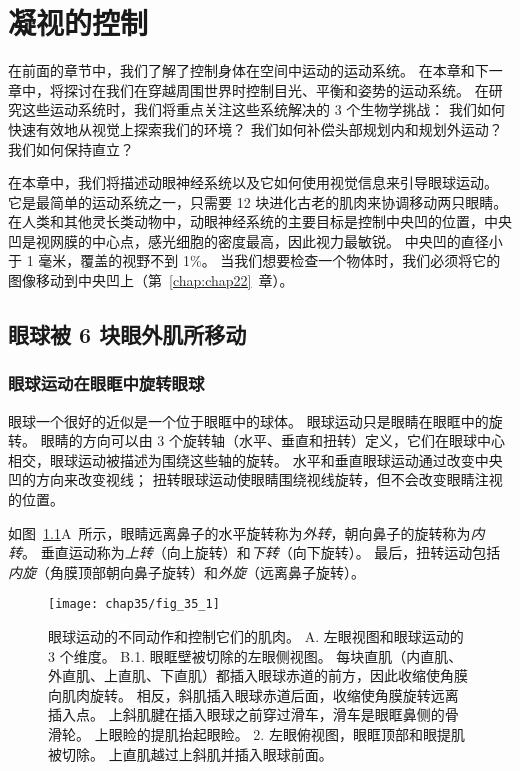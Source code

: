 \chapter{凝视的控制} \label{chap:chap35}

在前面的章节中，我们了解了控制身体在空间中运动的运动系统。
在本章和下一章中，将探讨在我们在穿越周围世界时控制目光、平衡和姿势的运动系统。
在研究这些运动系统时，我们将重点关注这些系统解决的 3 个生物学挑战：
我们如何快速有效地从视觉上探索我们的环境？
我们如何补偿头部规划内和规划外运动？
我们如何保持直立？


在本章中，我们将描述动眼神经系统以及它如何使用视觉信息来引导眼球运动。
它是最简单的运动系统之一，只需要 12 块进化古老的肌肉来协调移动两只眼睛。
在人类和其他灵长类动物中，动眼神经系统的主要目标是控制中央凹的位置，中央凹是视网膜的中心点，感光细胞的密度最高，因此视力最敏锐。
中央凹的直径小于 1 毫米，覆盖的视野不到 1\%。
当我们想要检查一个物体时，我们必须将它的图像移动到中央凹上（第~\ref{chap:chap22}~章）。



\section{眼球被 6 块眼外肌所移动}

\subsection{眼球运动在眼眶中旋转眼球}

眼球一个很好的近似是一个位于眼眶中的球体。
眼球运动只是眼睛在眼眶中的旋转。
眼睛的方向可以由 3 个旋转轴（水平、垂直和扭转）定义，它们在眼球中心相交，眼球运动被描述为围绕这些轴的旋转。
水平和垂直眼球运动通过改变中央凹的方向来改变视线；
扭转眼球运动使眼睛围绕视线旋转，但不会改变眼睛注视的位置。


如图~\ref{fig:35_1}A~所示，眼睛远离鼻子的水平旋转称为\textit{外转}，朝向鼻子的旋转称为\textit{内转}。 
垂直运动称为\textit{上转}（向上旋转）和\textit{下转}（向下旋转）。
最后，扭转运动包括\textit{内旋}（角膜顶部朝向鼻子旋转）和\textit{外旋}（远离鼻子旋转）。


\begin{figure}[htbp]
	\centering
	\texttt{[image: chap35/fig\_35\_1]}
	\caption{眼球运动的不同动作和控制它们的肌肉。
		A. 左眼视图和眼球运动的 3 个维度。
		B.1. 眼眶壁被切除的左眼侧视图。
		每块直肌（内直肌、外直肌、上直肌、下直肌）都插入眼球赤道的前方，因此收缩使角膜向肌肉旋转。
		相反，斜肌插入眼球赤道后面，收缩使角膜旋转远离插入点。
		上斜肌腱在插入眼球之前穿过滑车，滑车是眼眶鼻侧的骨滑轮。
		上眼睑的提肌抬起眼睑。
		2. 左眼俯视图，眼眶顶部和眼提肌被切除。 
		上直肌越过上斜肌并插入眼球前面。}
	\label{fig:35_1}
\end{figure}


